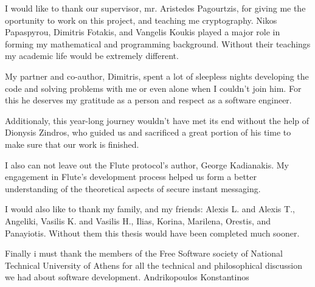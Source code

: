 \documentclass[
11pt, %
english, %
singlespacing, %
parskip, %
headsepline, %
]{MastersDoctoralThesis} %
\begin{document}
\begin{acknowledgements}
\addchaptertocentry{\acknowledgementname} %

I would like to thank our supervisor, mr. Aristedes Pagourtzis, for giving me the oportunity to work on this project, and teaching me cryptography.
Nikos Papaspyrou, Dimitris Fotakis, and Vangelis Koukis played a major role in forming my mathematical and programming background.
Without their teachings my academic life would be extremely different.

My partner and co-author, Dimitris, spent a lot of sleepless nights developing the code and solving problems with me or even alone when I couldn't join him.
For this he deserves my gratitude as a person and respect as a software engineer.

Additionaly, this year-long journey wouldn't have met its end without the help of Dionysis Zindros, who guided us and sacrificed a great portion of his time to make sure that our work is finished.

I also can not leave out the Flute protocol's author, George Kadianakis.
My engagement in Flute's development process helped us form a better understanding of the theoretical aspects of secure instant messaging.

I would also like to thank my family, and my friends: Alexis L. and Alexis T., Angeliki, Vasilis K. and Vasilis H., Ilias, Korina, Marilena, Orestis, and Panayiotis.
Without them this thesis would have been completed much sooner.

Finally i must thank the members of the Free Software society of National Technical University of Athens for all the technical and philosophical discussion we had about software development.
\bigbreak
\hfill Andrikopoulos Konstantinos


\end{acknowledgements}


\tableofcontents %

\listofalgorithms

\listoffigures %


\end{document}
